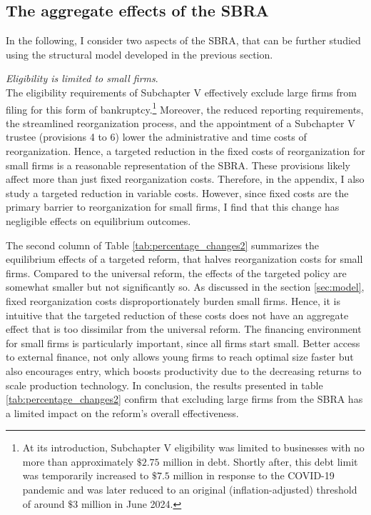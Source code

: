 \documentclass[12pt]{article}
\begin{document}
\subsection{The aggregate effects of the SBRA}

In the following, I consider two aspects of the SBRA, that can be further studied using the structural model developed in the previous section.

\noindent \textit{Eligibility is limited to small firms}. \\ 
The eligibility requirements of Subchapter V effectively exclude large firms from filing for this form of bankruptcy.\footnote{At its introduction, Subchapter V eligibility was limited to businesses with no more than approximately $\$2.75$ million in debt. Shortly after, this debt limit was temporarily increased to $\$7.5$ million in response to the COVID-19 pandemic and was later reduced to an original (inflation-adjusted) threshold of around $\$3$ million in June 2024.} Moreover, the reduced reporting requirements, the streamlined reorganization process, and the appointment of a Subchapter V trustee (provisions 4 to 6) lower the administrative and time costs of reorganization. Hence, a targeted reduction in the fixed costs of reorganization for small firms is a reasonable representation of the SBRA. These provisions likely affect more than just fixed reorganization costs. Therefore, in the appendix, I also study a targeted reduction in variable costs. However, since fixed costs are the primary barrier to reorganization for small firms, I find that this change has negligible effects on equilibrium outcomes.

The second column of Table \ref{tab:percentage_changes2} summarizes the equilibrium effects of a targeted reform, that halves reorganization costs for small firms. Compared to the universal reform, the effects of the targeted policy are somewhat smaller but not significantly so. As discussed in the section \ref{sec:model}, fixed reorganization costs disproportionately burden small firms. Hence, it is intuitive that the targeted reduction of these costs does not have an aggregate effect that is too dissimilar from the universal reform. The financing environment for small firms is particularly important, since all firms start small. Better access to external finance, not only allows young firms to reach optimal size faster but also encourages entry, which boosts productivity due to the decreasing returns to scale production technology. In conclusion, the results presented in table \ref{tab:percentage_changes2} confirm that excluding large firms from the SBRA has a limited impact on the reform's overall effectiveness. \vspace{3mm} 
\end{document}
